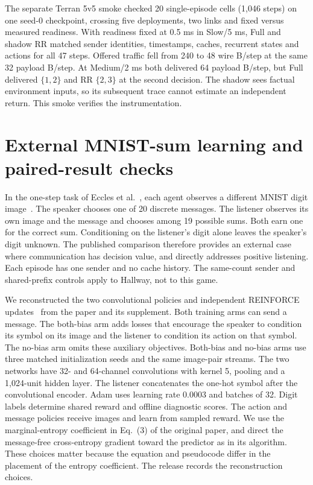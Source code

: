 \documentclass[pdflatex,sn-mathphys-num]{sn-jnl}
\begin{document}
The separate Terran 5v5 smoke checked 20 single-episode cells (1,046 steps) on one seed-0 checkpoint, crossing five deployments, two links and fixed versus measured readiness. With readiness fixed at 0.5 ms in Slow/5 ms, Full and shadow RR matched sender identities, timestamps, caches, recurrent states and actions for all 47 steps. Offered traffic fell from 240 to 48 wire B/step at the same 32 payload B/step. At Medium/2 ms both delivered 64 payload B/step, but Full delivered $\{1,2\}$ and RR $\{2,3\}$ at the second decision. The shadow sees factual environment inputs, so its subsequent trace cannot estimate an independent return. This smoke verifies the instrumentation.

\FloatBarrier
\section{External MNIST-sum learning and paired-result checks}\label{app:external}
In the one-step task of Eccles et al.~\citep{eccles2019biases}, each agent observes a different MNIST digit image~\citep{lecun1998gradient}. The speaker chooses one of 20 discrete messages. The listener observes its own image and the message and chooses among 19 possible sums. Both earn one for the correct sum. Conditioning on the listener's digit alone leaves the speaker's digit unknown. The published comparison therefore provides an external case where communication has decision value, and directly addresses positive listening. Each episode has one sender and no cache history. The same-count sender and shared-prefix controls apply to Hallway, not to this game.

We reconstructed the two convolutional policies and independent REINFORCE updates~\citep{williams1992simple} from the paper and its supplement. Both training arms can send a message. The both-bias arm adds losses that encourage the speaker to condition its symbol on its image and the listener to condition its action on that symbol. The no-bias arm omits these auxiliary objectives. Both-bias and no-bias arms use three matched initialization seeds and the same image-pair streams. The two networks have 32- and 64-channel convolutions with kernel 5, pooling and a 1,024-unit hidden layer. The listener concatenates the one-hot symbol after the convolutional encoder. Adam uses learning rate 0.0003 and batches of 32. Digit labels determine shared reward and offline diagnostic scores. The action and message policies receive images and learn from sampled reward. We use the marginal-entropy coefficient in Eq.~(3) of the original paper, and direct the message-free cross-entropy gradient toward the predictor as in its algorithm. These choices matter because the equation and pseudocode differ in the placement of the entropy coefficient. The release records the reconstruction choices.
\end{document}
